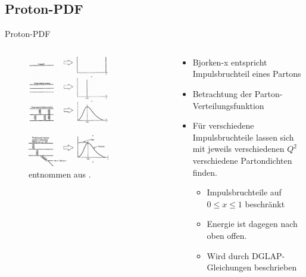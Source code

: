 \documentclass[aspectratio=1610, 9pt]{beamer}
\begin{document}
\subsection{Proton-PDF}

\begin{frame}{Proton-PDF}
\begin{columns}
  \begin{column}{0.45\textwidth}
    \begin{figure}
    \centering
    \includegraphics[width=0.7\textwidth]{images/Bjorken-1.png}
  \end{figure}
  \begin{figure}
    \centering
    \includegraphics[width=0.7\textwidth]{images/Bjorken-2.png}
    \caption{entnommen aus \cite{TP}.}
  \end{figure}
  \end{column}
  \begin{column}{0.55\textwidth}
    \begin{itemize}
      \item{Bjorken-x entspricht Impulsbruchteil eines Partons}
      \item{Betrachtung der Parton-Verteilungsfunktion}
      \item{Für verschiedene Impulsbruchteile lassen sich mit jeweils verschiedenen $Q^2$ verschiedene Partondichten finden.}
      \begin{itemize}
        \item{Impulsbruchteile auf $0 \le x \le 1$ beschränkt}
        \item{Energie ist dagegen nach oben offen.}
        \item{Wird durch DGLAP-Gleichungen beschrieben}
      \end{itemize}
    \end{itemize}
  \end{column}
\end{columns}
\end{frame}
\end{document}
